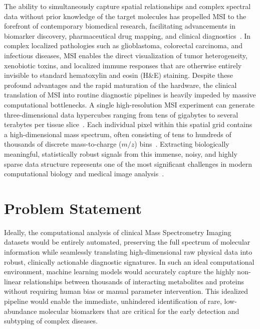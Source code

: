 \documentclass[
12pt, %
oneside, %
english, %
onehalfspacing, %
nolistspacing, %
headsepline, %
]{MastersDoctoralThesis} %
\begin{document}
The ability to simultaneously capture spatial relationships and complex spectral data without prior knowledge of the target molecules has propelled MSI to the forefront of contemporary biomedical research, facilitating advancements in biomarker discovery, pharmaceutical drug mapping, and clinical diagnostics~\citep{abdelmoula2021peak}. In complex localized pathologies such as glioblastoma, colorectal carcinoma, and infectious diseases, MSI enables the direct visualization of tumor heterogeneity, xenobiotic toxins, and localized immune responses that are otherwise entirely invisible to standard hematoxylin and eosin (H\&E) staining. Despite these profound advantages and the rapid maturation of the hardware, the clinical translation of MSI into routine diagnostic pipelines is heavily impeded by massive computational bottlenecks. A single high-resolution MSI experiment can generate three-dimensional data hypercubes ranging from tens of gigabytes to several terabytes per tissue slice~\citep{korber2025mass}. Each individual pixel within this spatial grid contains a high-dimensional mass spectrum, often consisting of tens to hundreds of thousands of discrete mass-to-charge ($m/z$) bins~\citep{abdelmoula2021peak}. Extracting biologically meaningful, statistically robust signals from this immense, noisy, and highly sparse data structure represents one of the most significant challenges in modern computational biology and medical image analysis~\citep{zhang2025msi_infectious}.

\section{Problem Statement}

Ideally, the computational analysis of clinical Mass Spectrometry Imaging datasets would be entirely automated, preserving the full spectrum of molecular information while seamlessly translating high-dimensional raw physical data into robust, clinically actionable diagnostic signatures. In such an ideal computational environment, machine learning models would accurately capture the highly non-linear relationships between thousands of interacting metabolites and proteins without requiring human bias or manual parameter intervention. This idealized pipeline would enable the immediate, unhindered identification of rare, low-abundance molecular biomarkers that are critical for the early detection and subtyping of complex diseases.
\end{document}
